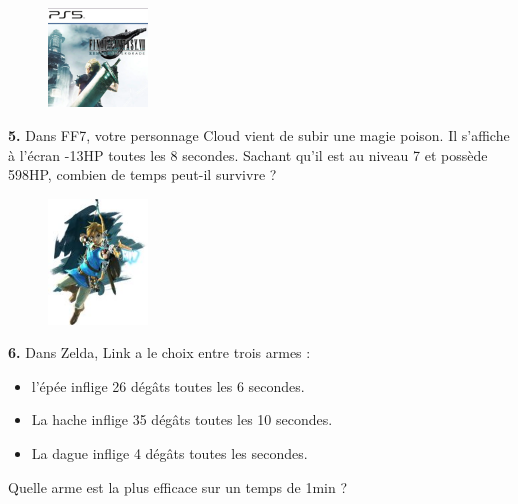 \begin{minipage}[t]{0.25\textwidth}
  \begin{figure}[H]
    \centering
    \includegraphics[width=100px]{4x1-relatifs/ex2.jpg}
  \end{figure}
\end{minipage}
\begin{minipage}[t]{0.75\textwidth}
  \textbf{5.} Dans FF7, votre personnage Cloud vient de subir une magie poison. Il s'affiche à l'écran -13HP toutes les 8 secondes. Sachant qu'il est au niveau 7 et possède 598HP, combien de temps peut-il survivre ?\\
  \Pointilles[6]
\end{minipage}

\Pointilles[3]

\begin{minipage}[t]{0.25\textwidth}
  \begin{figure}[H]
    \centering
    \includegraphics[width=100px]{4x1-relatifs/ex3.jpg}
  \end{figure}
\end{minipage}
\begin{minipage}[t]{0.75\textwidth}
  \textbf{6.} Dans Zelda, Link a le choix entre trois armes : 
  \begin{itemize}
    \item l'épée inflige 26 dégâts toutes les 6 secondes.
    \item La hache inflige 35 dégâts toutes les 10 secondes.
    \item La dague inflige 4 dégâts toutes les secondes.
  \end{itemize}
  Quelle arme est la plus efficace sur un temps de 1min ?\\
  \Pointilles[5]
\end{minipage}

\Pointilles[3]

